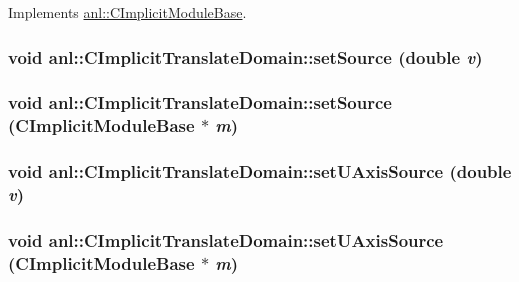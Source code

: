 Implements \hyperlink{classanl_1_1CImplicitModuleBase_ab88f8a1822dcfbc13ba5230318b0acd1}{anl::CImplicitModuleBase}.\hypertarget{classanl_1_1CImplicitTranslateDomain_a073229df54e8a1197e57b719aa81a61a}{
\subsubsection[{setSource}]{\setlength{\rightskip}{0pt plus 5cm}void anl::CImplicitTranslateDomain::setSource (double {\em v})}}
\label{classanl_1_1CImplicitTranslateDomain_a073229df54e8a1197e57b719aa81a61a}
\hypertarget{classanl_1_1CImplicitTranslateDomain_a1b35f0ba2ddca5435c0ce1da6e842174}{
\subsubsection[{setSource}]{\setlength{\rightskip}{0pt plus 5cm}void anl::CImplicitTranslateDomain::setSource ({\bf CImplicitModuleBase} $\ast$ {\em m})}}
\label{classanl_1_1CImplicitTranslateDomain_a1b35f0ba2ddca5435c0ce1da6e842174}
\hypertarget{classanl_1_1CImplicitTranslateDomain_a2d4e1351865ff18ed847f01bbec07b7a}{
\subsubsection[{setUAxisSource}]{\setlength{\rightskip}{0pt plus 5cm}void anl::CImplicitTranslateDomain::setUAxisSource (double {\em v})}}
\label{classanl_1_1CImplicitTranslateDomain_a2d4e1351865ff18ed847f01bbec07b7a}
\hypertarget{classanl_1_1CImplicitTranslateDomain_adb76061648e6d25c567b7bcf2da81869}{
\subsubsection[{setUAxisSource}]{\setlength{\rightskip}{0pt plus 5cm}void anl::CImplicitTranslateDomain::setUAxisSource ({\bf CImplicitModuleBase} $\ast$ {\em m})}}

